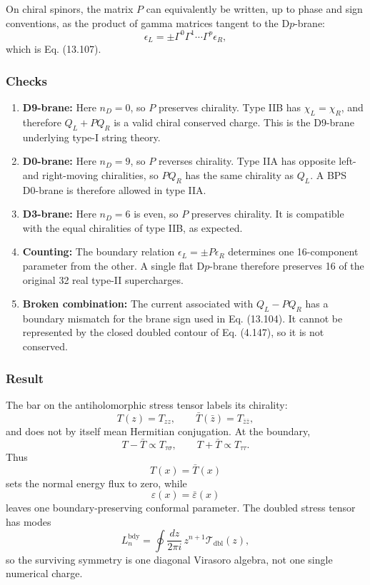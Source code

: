 \documentclass[
  10pt,
  a4paper,
  openany]{book}
\begin{document}
On chiral spinors, the matrix \(P\) can equivalently be written, up to
phase and sign conventions, as the product of gamma matrices tangent to
the D\(p\)-brane: \[
\epsilon_L
=\pm\Gamma^0\Gamma^1\cdots\Gamma^p\epsilon_R,
\] which is Eq. (13.107).

\subsubsection{Checks}\label{checks-14}

\begin{enumerate}
\def\labelenumi{\arabic{enumi}.}
\item
  \textbf{D9-brane:} Here \(n_D=0\), so \(P\) preserves chirality. Type
  IIB has \(\chi_L=\chi_R\), and therefore \(Q_L+P Q_R\) is a valid
  chiral conserved charge. This is the D9-brane underlying type-I string
  theory.
\item
  \textbf{D0-brane:} Here \(n_D=9\), so \(P\) reverses chirality. Type
  IIA has opposite left- and right-moving chiralities, so \(P Q_R\) has
  the same chirality as \(Q_L\). A BPS D0-brane is therefore allowed in
  type IIA.
\item
  \textbf{D3-brane:} Here \(n_D=6\) is even, so \(P\) preserves
  chirality. It is compatible with the equal chiralities of type IIB, as
  expected.
\item
  \textbf{Counting:} The boundary relation
  \(\epsilon_L=\pm P\epsilon_R\) determines one 16-component parameter
  from the other. A single flat D\(p\)-brane therefore preserves 16 of
  the original 32 real type-II supercharges.
\item
  \textbf{Broken combination:} The current associated with \(Q_L-P Q_R\)
  has a boundary mismatch for the brane sign used in Eq. (13.104). It
  cannot be represented by the closed doubled contour of Eq. (4.147), so
  it is not conserved.
\end{enumerate}

\subsubsection{Result}\label{result-18}

The bar on the antiholomorphic stress tensor labels its chirality: \[
T(z)=T_{zz},
\qquad
\bar T(\bar z)=T_{\bar z\bar z},
\] and does not by itself mean Hermitian conjugation. At the boundary,
\[
T-\bar T\propto T_{\tau\sigma},
\qquad
T+\bar T\propto T_{\tau\tau}.
\] Thus \[
T(x)=\bar T(x)
\] sets the normal energy flux to zero, while \[
\varepsilon(x)=\bar\varepsilon(x)
\] leaves one boundary-preserving conformal parameter. The doubled
stress tensor has modes \[
L_n^{\mathrm{bdy}}
=
\oint\frac{dz}{2\pi i}\,
z^{n+1}\mathcal T_{\mathrm{dbl}}(z),
\] so the surviving symmetry is one diagonal Virasoro algebra, not one
single numerical charge.
\end{document}
